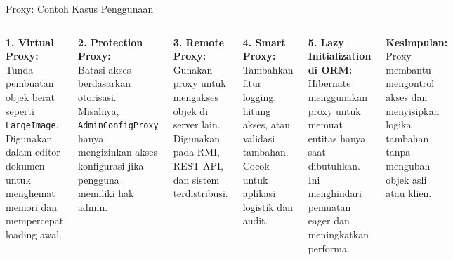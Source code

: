 \documentclass[aspectratio=169, table]{beamer}
\begin{document}
\begin{frame}{Proxy: Contoh Kasus Penggunaan}
	\vspace{20pt}
	\begin{columns}[T,onlytextwidth]
		\textbf{1. Virtual Proxy:} \\
		Tunda pembuatan objek berat seperti \texttt{LargeImage}. Digunakan dalam editor dokumen untuk menghemat memori dan mempercepat loading awal.
		
		\textbf{2. Protection Proxy:} \\
		Batasi akses berdasarkan otorisasi. Misalnya, \texttt{AdminConfigProxy} hanya mengizinkan akses konfigurasi jika pengguna memiliki hak admin.
		
		\textbf{3. Remote Proxy:} \\
		Gunakan proxy untuk mengakses objek di server lain. Digunakan pada RMI, REST API, dan sistem terdistribusi.
		
		\textbf{4. Smart Proxy:} \\
		Tambahkan fitur logging, hitung akses, atau validasi tambahan. Cocok untuk aplikasi logistik dan audit.
		
		\textbf{5. Lazy Initialization di ORM:} \\
		Hibernate menggunakan proxy untuk memuat entitas hanya saat dibutuhkan. Ini menghindari pemuatan eager dan meningkatkan performa.
		
		\vspace{10pt}
		\textbf{Kesimpulan:} Proxy membantu mengontrol akses dan menyisipkan logika tambahan tanpa mengubah objek asli atau klien.
	\end{columns}
\end{frame}
\end{document}
